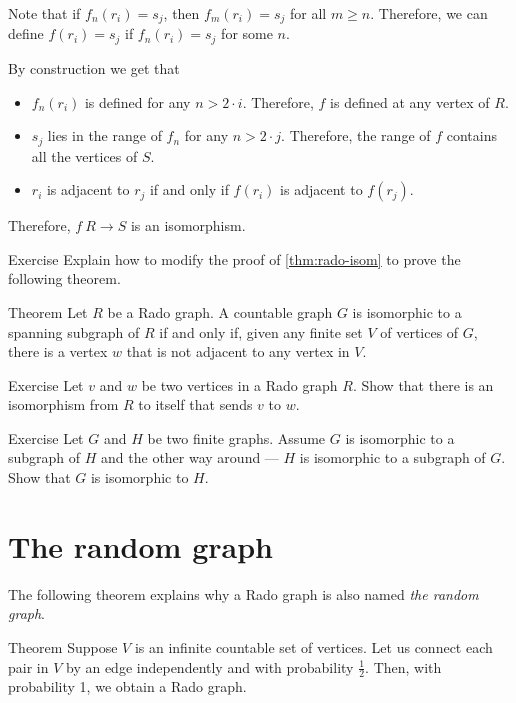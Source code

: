 Note that if $f_n(r_i)=s_j$, then $f_m(r_i)=s_j$ for all $m\ge n$.
Therefore, we can define $f(r_i)=s_j$ if $f_n(r_i)=s_j$ for some $n$.


By construction we get that 
\begin{itemize}
\item $f_n(r_i)$ is defined for any $n>2\cdot i$. Therefore, $f$ is defined at any vertex of $R$.
\item $s_j$ lies in the range of $f_n$ for any $n>2\cdot j$.
Therefore, the range of $f$ contains all the vertices of $S$.
\item $r_i$ is adjacent to $r_j$ if and only if $f(r_i)$ is adjacent to $f(r_j)$.
\end{itemize}
Therefore, $f\:R\to S$ is an isomorphism.
\qeds

\begin{thm}{Exercise}\label{ex:rado-isom-generalization}
Explain how to modify the proof of \ref{thm:rado-isom} to prove the following theorem.
\end{thm}


\begin{thm}{Theorem}
Let $R$ be a Rado graph.
A countable graph $G$ is isomorphic to a spanning subgraph of $R$ if and only if, given any finite set $V$ of vertices of $G$, there is a vertex $w$ that is not adjacent to any vertex in $V$.
\end{thm}

\begin{thm}{Exercise}\label{ex:Rv>w}
Let $v$ and $w$ be two vertices in a Rado graph $R$.
Show that there is an isomorphism from $R$ to itself that sends $v$ to $w$.
\end{thm}

\begin{thm}{Exercise}\label{ex:finite-subgraphs}
Let $G$ and $H$ be two finite graphs.
Assume $G$ is isomorphic to a subgraph of $H$ 
and the other way around --- $H$ is isomorphic to a subgraph of $G$.
Show that $G$ is isomorphic to $H$.
\end{thm}


\section{The random graph}

The following theorem explains why a Rado graph is also named \textit{the random graph}.

\begin{thm}{Theorem}\label{thm:the-random-graph}
Suppose $V$ is an infinite countable set of vertices.
Let us connect each pair in $V$ by an edge independently and with probability $\tfrac12$.
Then, with probability 1, we obtain a Rado graph.
\end{thm}

